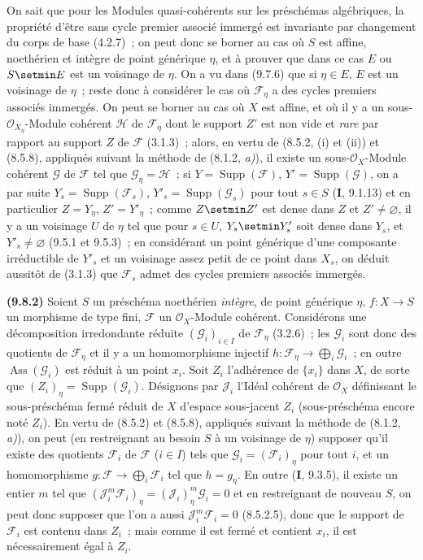 On sait que pour les Modules quasi-cohérents sur les préschémas algébriques, la
propriété d'être sans cycle premier associé immergé est invariante par
changement du corps de base (4.2.7)~; on peut donc se borner au cas où $S$ est
affine, noethérien et intègre de point générique $\eta$, et à prouver que dans
ce cas $E$ ou $S\setmin E$ est un voisinage de $\eta$. On a vu dans (9.7.6) que si
$\eta\in E$, $E$ est un voisinage de $\eta$~; reste donc à considérer le cas où
$\mathcal F_\eta$ a des cycles premiers associés immergés. On peut se borner au
cas où $X$ est affine, et où il y a un sous-$\mathcal O_{X_\eta}$-Module
cohérent $\mathcal H$ de $\mathcal F_\eta$ dont le support $Z'$ est non vide et
\emph{rare} par rapport au support $Z$ de $\mathcal F$ (3.1.3)~; alors, en vertu
de (8.5.2, (i) et (ii))
et (8.5.8), appliqués suivant la méthode de (8.1.2, \emph{a)}), il existe un
sous-$\mathcal O_X$-Module cohérent $\mathcal G$ de $\mathcal F$ tel que
$\mathcal G_\eta=\mathcal H$~; si $Y=\operatorname{Supp}(\mathcal F)$,
$Y'=\operatorname{Supp}(\mathcal G)$, on a par suite
$Y_s=\operatorname{Supp}(\mathcal F_s)$, $Y'_s=\operatorname{Supp}(\mathcal G_s)$
pour tout $s\in S$ (\textbf{I}, 9.1.13) et en particulier $Z=Y_\eta$,
$Z'=Y'_\eta$~; comme $Z\setmin Z'$ est dense dans $Z$ et $Z'\neq\varnothing$, il y a
un voisinage $U$ de $\eta$ tel que pour $s\in U$, $Y_s\setmin Y'_s$ soit dense dans
$Y_s$, et $Y'_s\neq\varnothing$ (9.5.1 et 9.5.3)~; en considérant un point
générique d'une composante irréductible de $Y'_s$ et un voisinage assez petit de
ce point dans $X_s$, on déduit aussitôt de (3.1.3) que $\mathcal F_s$ admet des
cycles premiers associés immergés.

\label{IV.9.8.2-fr}%
\textbf{(9.8.2)} Soient $S$ un préschéma noethérien \emph{intègre}, de point
générique $\eta$, $f:X\to S$ un morphisme de type fini, $\mathcal F$ un
$\mathcal O_X$-Module cohérent. Considérons une décomposition irredondante
réduite $(\mathcal G_i)_{i\in I}$ de $\mathcal F_\eta$ (3.2.6)~; les
$\mathcal G_i$ sont donc des quotients de $\mathcal F_\eta$ et il y a un
homomorphisme injectif
$h:\mathcal F_\eta\to\bigoplus_i\mathcal G_i$~; en outre
$\operatorname{Ass}(\mathcal G_i)$ est réduit à un point $x_i$. Soit $Z_i$
l'adhérence de $\{x_i\}$ dans $X$, de sorte que
$(Z_i)_\eta=\operatorname{Supp}(\mathcal G_i)$. Désignons par $\mathcal J_i$
l'Idéal cohérent de $\mathcal O_X$ définissant le sous-préschéma fermé réduit de
$X$ d'espace sous-jacent $Z_i$ (sous-préschéma encore noté $Z_i$). En vertu de
(8.5.2) et (8.5.8), appliqués suivant la méthode de (8.1.2, \emph{a)}), on peut
(en restreignant au besoin $S$ à un voisinage de $\eta$) supposer qu'il existe
des quotients $\mathcal F_i$ de $\mathcal F$ ($i\in I$) tels que
$\mathcal G_i=(\mathcal F_i)_\eta$ pour tout $i$, et un homomorphisme
$g:\mathcal F\to\bigoplus_i\mathcal F_i$ tel que $h=g_\eta$. En outre
(\textbf{I}, 9.3.5), il existe un entier $m$ tel que
$(\mathcal J_i^m\mathcal F_i)_\eta=(\mathcal J_i)_\eta^m\mathcal G_i=0$ et en
restreignant de nouveau $S$, on peut donc supposer que l'on a aussi
$\mathcal J_i^m\mathcal F_i=0$ (8.5.2.5), donc que le support de $\mathcal F_i$
est contenu dans $Z_i$~; mais comme il est fermé et contient $x_i$, il est
nécessairement égal à $Z_i$.

